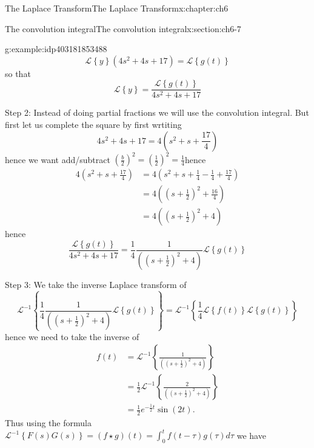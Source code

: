 \documentclass[oneside,10pt,]{book}
\numberwithin{equation}{section}
\numberwithin{equation}{section}
\newcommand{\amp}{&}
\begin{document}
\begin{chapterptx}{The Laplace Transform}{}{The Laplace Transform}{}{}{x:chapter:ch6}
\begin{sectionptx}{The convolution integral}{}{The convolution integral}{}{}{x:section:ch6-7}
\begin{example}{}{g:example:idp403181853488}
\begin{equation*}
\mathcal{L}\left\{ y\right\} \left(4s^{2}+4s+17\right)=\mathcal{L}\left\{ g(t)\right\} 
\end{equation*}
so that%
\begin{equation*}
\mathcal{L}\left\{ y\right\} =\frac{\mathcal{L}\left\{ g(t)\right\} }{4s^{2}+4s+17}
\end{equation*}
%
\par
Step 2: Instead of doing partial fractions we will use the convolution integral. But first let us complete the square by first wrtiting%
\begin{equation*}
4s^{2}+4s+17=4\left(s^{2}+s+\frac{17}{4}\right)
\end{equation*}
hence we want add\slash{}subtract \(\left(\frac{b}{2}\right)^{2}=\left(\frac{1}{2}\right)^{2}=\frac{1}{4}\)hence%
\begin{align*}
4\left(s^{2}+s+\frac{17}{4}\right) \amp =4\left(s^{2}+s+\frac{1}{4}-\frac{1}{4}+\frac{17}{4}\right)\\
\amp =4\left(\left(s+\frac{1}{2}\right)^{2}+\frac{16}{4}\right)\\
\amp =4\left(\left(s+\frac{1}{2}\right)^{2}+4\right)
\end{align*}
hence%
\begin{equation*}
\frac{\mathcal{L}\left\{ g(t)\right\} }{4s^{2}+4s+17}=\frac{1}{4}\frac{1}{\left(\left(s+\frac{1}{2}\right)^{2}+4\right)}\mathcal{L}\left\{ g(t)\right\} 
\end{equation*}
%
\par
Step 3: We take the inverse Laplace transform of%
\begin{equation*}
\mathcal{L}^{-1}\left\{ \frac{1}{4}\frac{1}{\left(\left(s+\frac{1}{2}\right)^{2}+4\right)}\mathcal{L}\left\{ g(t)\right\} \right\} =\mathcal{L}^{-1}\left\{ \frac{1}{4}\mathcal{L}\left\{ f(t)\right\} \mathcal{L}\left\{ g(t)\right\} \right\} 
\end{equation*}
hence we need to take the inverse of%
\begin{align*}
f(t) \amp =\mathcal{L}^{-1}\left\{ \frac{1}{\left(\left(s+\frac{1}{2}\right)^{2}+4\right)}\right\} \\
\amp =\frac{1}{2}\mathcal{L}^{-1}\left\{ \frac{2}{\left(\left(s+\frac{1}{2}\right)^{2}+4\right)}\right\} \\
\amp =\frac{1}{2}e^{-\frac{1}{2}t}\sin\left(2t\right).
\end{align*}
Thus using the formula \(\mathcal{L}^{-1}\left\{ F(s)G(s)\right\} =\left(f\star g\right)(t)=\int_{0}^{t}f\left(t-\tau\right)g\left(\tau\right)d\tau\) we have%
\begin{align*}

\end{align*}
\end{example}
\end{sectionptx}
\end{chapterptx}
\end{document}
